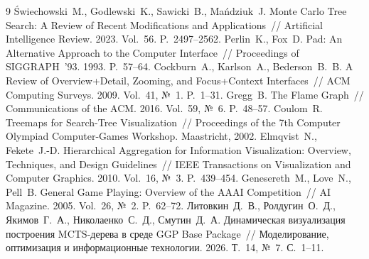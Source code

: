 \documentclass[12pt,a4paper]{article}
\begin{document}
\begin{thebibliography}{9}\footnotesize
\setlength{\itemsep}{0pt}\setlength{\parskip}{0pt}
\bibitem{} Świechowski~M., Godlewski~K., Sawicki~B., Mańdziuk~J. Monte Carlo
Tree Search: A Review of Recent Modifications and Applications~//
Artificial Intelligence Review. 2023. Vol.~56. P.~2497--2562.
\bibitem{} Perlin~K., Fox~D. Pad: An Alternative Approach to the Computer
Interface~// Proceedings of SIGGRAPH~'93. 1993. P.~57--64.
\bibitem{} Cockburn~A., Karlson~A., Bederson~B.~B. A Review of
Overview+Detail, Zooming, and Focus+Context Interfaces~// ACM Computing
Surveys. 2009. Vol.~41, №~1. P.~1--31.
\bibitem{} Gregg~B. The Flame Graph~// Communications of the ACM. 2016.
Vol.~59, №~6. P.~48--57.
\bibitem{} Coulom~R. Treemaps for Search-Tree Visualization~// Proceedings
of the 7th Computer Olympiad Computer-Games Workshop. Maastricht, 2002.
\bibitem{} Elmqvist~N., Fekete~J.-D. Hierarchical Aggregation for
Information Visualization: Overview, Techniques, and Design Guidelines~//
IEEE Transactions on Visualization and Computer Graphics. 2010. Vol.~16,
№~3. P.~439--454.
\bibitem{} Genesereth~M., Love~N., Pell~B. General Game Playing: Overview of
the AAAI Competition~// AI Magazine. 2005. Vol.~26, №~2. P.~62--72.
\bibitem{} Литовкин~Д.~В., Ролдугин~О.~Д., Якимов~Г.~А., Николаенко~С.~Д.,
Смутин~Д.~А. Динамическая визуализация построения MCTS-дерева в среде GGP
Base Package~// Моделирование, оптимизация и информационные технологии.
2026. Т.~14, №~7. С.~1--11.
\end{thebibliography}
\end{document}
